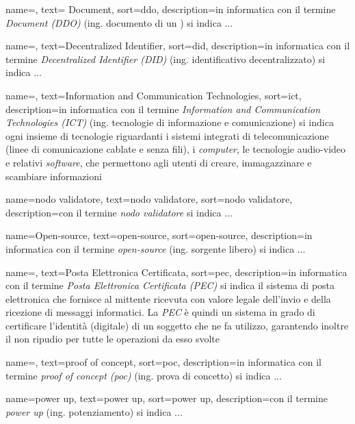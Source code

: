 {
	name=,
	text= Document,
	sort=ddo,
	description={in informatica con il termine \emph{ Document (DDO)} (ing. documento di un ) si indica ...}
}

{
	name=,
	text=Decentralized Identifier,
	sort=did,
	description={in informatica con il termine \emph{Decentralized Identifier (DID)} (ing. identificativo decentralizzato) si indica ...}
}

{
	name=,
	text=Information and Communication Technologies,
	sort=ict,
	description={in informatica con il termine \emph{Information and Communication Technologies (ICT)} (ing. tecnologie di informazione e comunicazione) si indica ogni insieme di tecnologie riguardanti i sistemi integrati di telecomunicazione (linee di comunicazione cablate e senza fili), i \textit{computer}, le tecnologie audio-video e relativi \textit{software}, che permettono agli utenti di creare, immagazzinare e scambiare informazioni}
}

{
	name=nodo validatore,
	text=nodo validatore,
	sort=nodo validatore,
	description={con il termine \emph{nodo validatore} si indica ...}
}

{
	name=Open-source,
	text=open-source,
	sort=open-source,
	description={in informatica con il termine \emph{open-source} (ing. sorgente libero) si indica ...}
}

{
	name=,
	text=Posta Elettronica Certificata,
	sort=pec,
	description={in informatica con il termine \emph{Posta Elettronica Certificata (PEC)} si indica il sistema di posta elettronica che fornisce al mittente ricevuta con valore legale dell’invio e della ricezione di messaggi informatici. La \textit{PEC} è quindi un sistema in grado di certificare l'identità (digitale) di un soggetto che ne fa utilizzo, garantendo inoltre il non ripudio per tutte le operazioni da esso svolte}
}

{
	name=,
	text=proof of concept,
	sort=poc,
	description={in informatica con il termine \emph{proof of concept (poc)} (ing. prova di concetto) si indica ...}
}

{
	name=power up,
	text=power up,
	sort=power up,
	description={con il termine \emph{power up} (ing. potenziamento) si indica ...}
}

